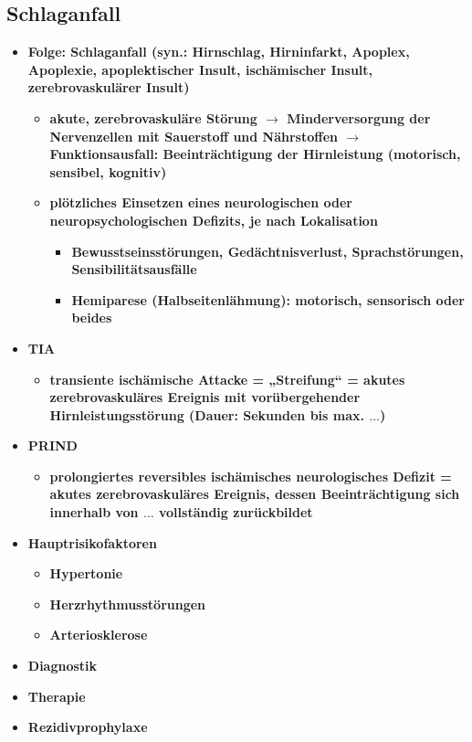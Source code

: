	\subsection{Schlaganfall}
		\begin{itemize}
			\item \textbf{Folge: Schlaganfall (syn.: Hirnschlag, Hirninfarkt, Apoplex, Apoplexie, apoplektischer Insult, ischämischer Insult, zerebrovaskulärer Insult)}
				\begin{itemize}
					\item \textbf{akute, zerebrovaskuläre Störung $\rightarrow$ Minderversorgung der Nervenzellen mit Sauerstoff und Nährstoffen $\rightarrow$ Funktionsausfall: Beeinträchtigung der Hirnleistung (motorisch, sensibel, kognitiv)}
					\item \textbf{plötzliches Einsetzen eines neurologischen oder neuropsychologischen Defizits, je nach Lokalisation}
						\begin{itemize}
							\item \textbf{Bewusstseinsstörungen, Gedächtnisverlust, Sprachstörungen, Sensibilitätsausfälle}
							\item \textbf{Hemiparese (Halbseitenlähmung): motorisch, sensorisch oder beides}
						\end{itemize}
				\end{itemize}
			\item \textbf{TIA}
				\begin{itemize}
					\item \textbf{transiente ischämische Attacke = „Streifung“ = akutes zerebrovaskuläres Ereignis mit vorübergehender Hirnleistungsstörung (Dauer: Sekunden bis max. $\dots$)}
				\end{itemize}
			\item \textbf{PRIND}
				\begin{itemize}
					\item \textbf{prolongiertes reversibles ischämisches neurologisches Defizit = akutes zerebrovaskuläres Ereignis, dessen Beeinträchtigung sich innerhalb von $\dots$ vollständig zurückbildet}
				\end{itemize}
	\pagebreak
			\item \textbf{Hauptrisikofaktoren}
				\begin{itemize}
					\item \textbf{Hypertonie}
					\item \textbf{Herzrhythmusstörungen}
					\item \textbf{Arteriosklerose}
				\end{itemize}
			\item \textbf{Diagnostik}
			\item \textbf{Therapie}
			\item \textbf{Rezidivprophylaxe}
		\end{itemize}
